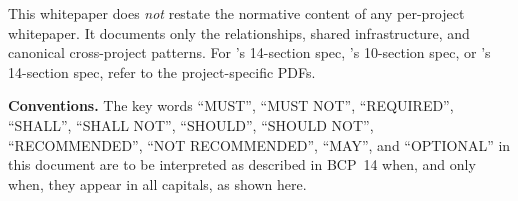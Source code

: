 \begin{calloutwarning}
This whitepaper does \emph{not} restate the normative content of any per-project whitepaper. It documents only the relationships, shared infrastructure, and canonical cross-project patterns. For \tesseraid{}'s 14-section spec, \tesserahash{}'s 10-section spec, or \tesseraseal{}'s 14-section spec, refer to the project-specific PDFs.
\end{calloutwarning}

\textbf{Conventions.} The key words ``MUST'', ``MUST NOT'', ``REQUIRED'', ``SHALL'', ``SHALL NOT'', ``SHOULD'', ``SHOULD NOT'', ``RECOMMENDED'', ``NOT RECOMMENDED'', ``MAY'', and ``OPTIONAL'' in this document are to be interpreted as described in BCP~14 \citep{rfc2119,rfc8174} when, and only when, they appear in all capitals, as shown here.
